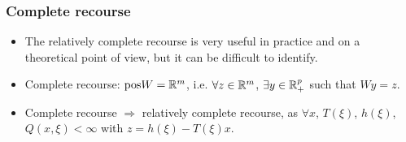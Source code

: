\documentclass[aspectratio=169]{beamer}
\begin{document}
\begin{frame}
\frametitle{Complete recourse}
	
\begin{itemize}
	\item 
	The relatively complete recourse is very useful in practice and on a theoretical point of view, but it can be difficult to identify.
\item
	{\red Complete recourse}: $\text{pos}W = {\mathbb{R}}^m$, i.e. $\forall z \in {\mathbb{R}}^m$, $\exists y \in {\mathbb{R}}^p_+$ such that $Wy = z$.
	\item
	Complete recourse $\Rightarrow$ relatively complete recourse, as 
$\forall x$, $T(\xi)$, $h(\xi)$, $Q(x,\xi) < \infty$ with $z = h(\xi)-T(\xi)x$.
\end{itemize}

\end{frame}
\end{document}
